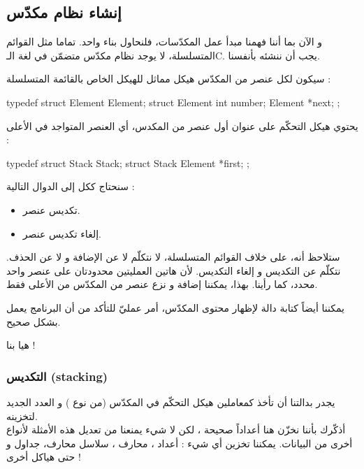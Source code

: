 \subsection{إنشاء نظام مكدّس}

و الآن بما أننا فهمنا مبدأ عمل المكدّسات، فلنحاول بناء واحد. تماما مثل القوائم المتسلسلة، لا يوجد نظام مكدّس متضمّن في لغة الـ\textenglish{C}.
يجب أن ننشئه بأنفسنا.

سيكون لكل عنصر من المكدّس هيكل مماثل للهيكل الخاص بالقائمة المتسلسلة :

\begin{Csource}
typedef struct Element Element;
struct Element
{
	int number;
	Element *next;
};
\end{Csource}

يحتوي هيكل التحكّم على عنوان أول عنصر من المكدس، أي العنصر المتواجد في الأعلى :

\begin{Csource}
typedef struct Stack Stack;
struct Stack
{
	Element *first;
};
\end{Csource}

سنحتاج ككل إلى الدوال التالية :

\begin{itemize}
	\item تكديس  عنصر.
	\item إلغاء تكديس عنصر.
\end{itemize}

ستلاحظ أنه، على خلاف القوائم المتسلسلة، لا نتكلّم لا عن الإضافة و لا عن الحذف. نتكلّم عن التكديس و إلغاء التكديس. لأن هاتين العمليتين محدودتان على عنصر واحد محدد، كما رأينا. بهذا، يمكننا إضافة و نزع عنصر من المكدّس من الأعلى فقط.

يمكننا أيضاً كتابة دالة لإظهار محتوى المكدّس، أمر عمليّ للتأكد من أن البرنامج يعمل بشكل صحيح.

هيا بنا  !

\subsubsection{التكديس (\textenglish{stacking})}

يجدر بدالتنا
أن تأخذ كمعاملين هيكل التحكّم في المكدّس (من نوع
)
و العدد الجديد لتخزينه.\\
أذكّرك بأننا نخزّن هنا أعداداً صحيحة
،
لكن لا شيء يمنعنا من تعديل هذه الأمثلة لأنواع أخرى من البيانات. يمكننا تخزين أي شيء : أعداد
،
محارف
،
سلاسل محارف، جداول و حتى هياكل أخرى !

